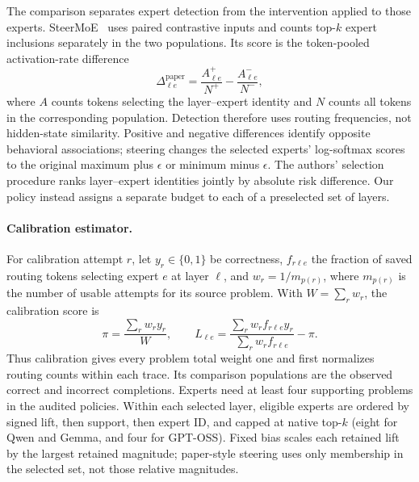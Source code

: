 \documentclass[12pt,a4paper,twoside,openright]{book}
\begin{document}
The comparison separates expert detection from the intervention applied to
those experts. SteerMoE~\cite[Sections~3.1--3.2]{fayyaz2025steermoe} uses
paired contrastive inputs and counts top-$k$ expert inclusions separately in
the two populations. Its score is the
token-pooled activation-rate difference
\begin{equation}
\Delta_{\ell e}^{\mathrm{paper}} =
\frac{A_{\ell e}^{+}}{N^{+}}-\frac{A_{\ell e}^{-}}{N^{-}},
\end{equation}
where $A$ counts tokens selecting the layer--expert identity and $N$ counts
all tokens in the corresponding population. Detection therefore uses routing
frequencies, not hidden-state similarity. Positive and negative differences
identify opposite behavioral associations; steering changes the selected
experts' log-softmax scores to the original maximum plus $\epsilon$ or minimum
minus $\epsilon$.
The authors' selection procedure ranks layer--expert identities jointly
by absolute risk difference.
Our policy instead assigns a separate budget to each of a preselected set
of layers.

\paragraph{Calibration estimator.}
For calibration attempt $r$, let $y_r\in\{0,1\}$ be correctness,
$f_{r\ell e}$ the fraction of saved routing tokens selecting expert $e$ at
layer $\ell$, and $w_r=1/m_{p(r)}$, where $m_{p(r)}$ is the number of usable
attempts for its source problem. With $W=\sum_r w_r$, the calibration score is
\begin{equation}
\pi=\frac{\sum_r w_r y_r}{W},\qquad
L_{\ell e}=\frac{\sum_r w_r f_{r\ell e}y_r}
                       {\sum_r w_r f_{r\ell e}}-\pi.
\end{equation}
Thus calibration gives every problem total weight one and first normalizes
routing counts within each trace. Its comparison populations are the observed correct and incorrect
completions.
Experts need at least four supporting problems in the audited policies.
Within each selected layer, eligible experts are ordered by signed lift,
then support, then expert ID, and capped at native top-$k$
(eight for Qwen and Gemma, and four for GPT-OSS). Fixed bias scales each
retained lift by the largest retained magnitude; paper-style steering uses
only membership in the selected set, not those relative magnitudes.
\end{document}

